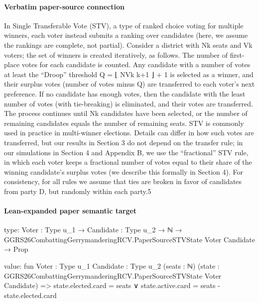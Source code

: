 \documentclass[10pt]{article}
\begin{document}
\paragraph{Verbatim paper-source connection}
\begin{ReviewVerbatim}
In Single Transferable Vote (STV), a type of ranked choice voting for multiple winners, each
voter instead submits a ranking over candidates (here, we assume the rankings are complete, not
partial). Consider a district with Nk seats and Vk voters; the set of winners is created iteratively, as
follows. The number of first-place votes for each candidate is counted. Any candidate with a number
of votes at least the “Droop” threshold Q = ⌊ NVk k+1 ⌋ + 1 is selected as a winner, and their surplus
votes (number of votes minus Q) are transferred to each voter’s next preference. If no candidate has
enough votes, then the candidate with the least number of votes (with tie-breaking) is eliminated,
and their votes are transferred. The process continues until Nk candidates have been selected, or
the number of remaining candidates equals the number of remaining seats. STV is commonly used
in practice in multi-winner elections.
    Details can differ in how such votes are transferred, but our results in Section 3 do not depend
on the transfer rule; in our simulations in Section 4 and Appendix B, we use the “fractional” STV
rule, in which each voter keeps a fractional number of votes equal to their share of the winning
candidate’s surplus votes (we describe this formally in Section 4). For consistency, for all rules we
assume that ties are broken in favor of candidates from party D, but randomly within each party.5
\end{ReviewVerbatim}



\paragraph{Lean-expanded paper semantic target}
\begin{ReviewVerbatim}
type:
{Voter : Type u_1} →
  {Candidate : Type u_2} → ℕ → GGRS26CombattingGerrymanderingRCV.PaperSourceSTVState Voter Candidate → Prop

value:
fun {Voter : Type u_1} {Candidate : Type u_2} (seats : ℕ)
    (state : GGRS26CombattingGerrymanderingRCV.PaperSourceSTVState Voter Candidate) =>
  state.elected.card = seats ∨ state.active.card = seats - state.elected.card
\end{ReviewVerbatim}
\end{document}
